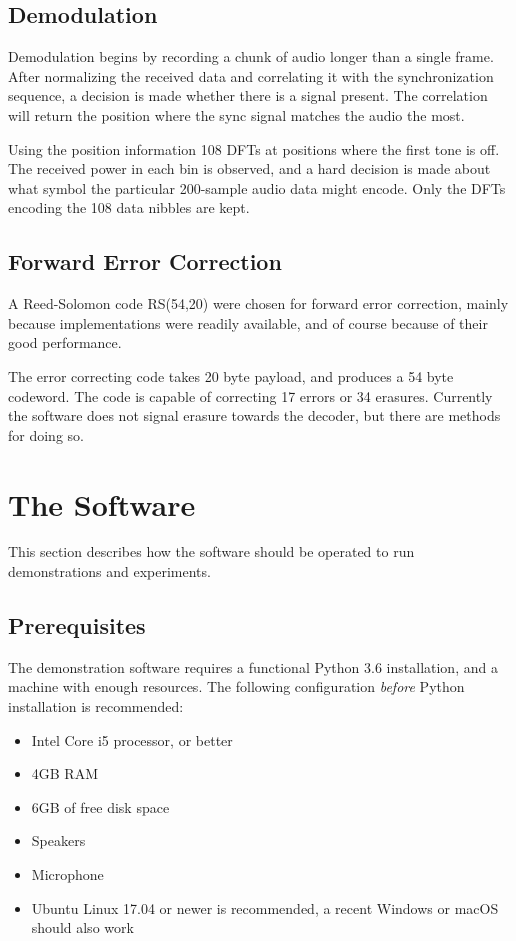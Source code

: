 \documentclass[a4paper]{article}
\begin{document}
\subsection{Demodulation}

Demodulation begins by recording a chunk of audio longer than a single
frame. After normalizing the received data and correlating it with the
synchronization sequence, a decision is made whether there is a signal
present. The correlation will return the position where the sync signal
matches the audio the most.

Using the position information 108 DFTs at positions where the first
tone is off. The received power in each bin is observed, and a hard
decision is made about what symbol the particular 200-sample audio data
might encode. Only the DFTs encoding the 108 data nibbles are kept.

\subsection{Forward Error Correction}

A Reed-Solomon code RS(54,20) were chosen for forward error correction,
mainly because implementations were readily available, and of course
because of their good performance.

The error correcting code takes 20 byte payload, and produces a 54 byte
codeword. The code is capable of correcting 17 errors or 34 erasures.
Currently the software does not signal erasure towards the decoder,
but there are methods\cite{ft1} for doing so.

\section{The Software}

This section describes how the software should be operated to run
demonstrations and experiments.

\subsection{Prerequisites}

The demonstration software requires a functional Python 3.6 
installation, and a machine with enough resources. The following 
configuration \textit{before} Python installation is recommended:

\begin{itemize}
\item Intel Core i5 processor, or better
\item 4GB RAM
\item 6GB of free disk space
\item Speakers
\item Microphone
\item Ubuntu Linux 17.04 or newer is recommended, a recent Windows or
macOS should also work
\end{itemize}
\end{document}
